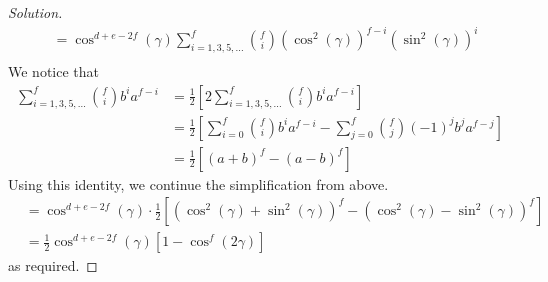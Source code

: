 \documentclass[11pt]{article}
\newenvironment{question}[2][Question]{\begin{trivlist}
\item[\hskip \labelsep {\bfseries #1}\hskip \labelsep {\bfseries #2.}]}{\end{trivlist}}
\newenvironment{solution}{\begin{proof}[Solution]}{\end{proof}}
\newcommand{\lr}[3]{\!\left#1 #3 \right#2}
\begin{document}
\begin{question}{2}
\begin{enumerate}[(a)]
\begin{solution}
\begin{align*}
                    &= \cos^{d+e-2f}(\gamma)\sum^f_{i=1,3,5,\dots}\binom{f}{i}(\cos^2(\gamma))^{f-i}(\sin^2(\gamma))^i \\
                \end{align*}
                We notice that
                \begin{align*}
                    \sum^f_{i=1,3,5,\dots}\binom{f}{i}b^ia^{f-i} 
                    &= \frac{1}{2}\lr[]{2\sum^f_{i=1,3,5,\dots}\binom{f}{i}b^ia^{f-i}} \\
                    &= \frac{1}{2}\lr[]{\sum^f_{i=0}\binom{f}{i}b^ia^{f-i}-\sum^f_{j=0}\binom{f}{j}(-1)^jb^ja^{f-j}} \\
                    &= \frac{1}{2}\lr[]{(a+b)^f-(a-b)^f}
                \end{align*}
                Using this identity, we continue the simplification from above.
                \begin{align*}
                    &= \cos^{d+e-2f}(\gamma)\cdot\frac{1}{2}\lr[]{(\cos^2(\gamma)+\sin^2(\gamma))^f-(\cos^2(\gamma)-\sin^2(\gamma))^f} \\
                    &= \frac{1}{2}\cos^{d+e-2f}(\gamma)\lr[]{1-\cos^f(2\gamma)}
                \end{align*}
                as required.
            \end{solution}
        \end{enumerate}
    \end{question}



\end{document}
